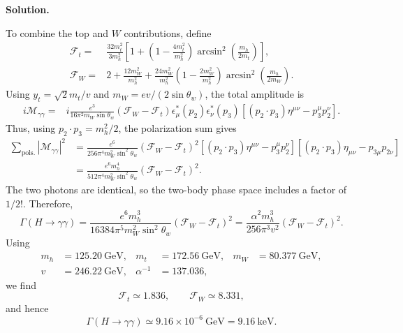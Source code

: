 \documentclass[a4paper,11pt]{article}
\newenvironment{solution}{\par\medskip\noindent\textbf{Solution.}\par\smallskip}{\par\medskip}
\begin{document}
\begin{solution}
To combine the top and $W$ contributions, define
\begin{equation}
\begin{aligned}
\mathcal F_t
={}&
\frac{32m_t^2}{3m_h^2}
\left[
1+\left(1-\frac{4m_t^2}{m_h^2}\right)
\arcsin^2\left(\frac{m_h}{2m_t}\right)
\right],
\\
\mathcal F_W
={}&
2+\frac{12m_W^2}{m_h^2}
+\frac{24m_W^2}{m_h^2}
\left(1-\frac{2m_W^2}{m_h^2}\right)
\arcsin^2\left(\frac{m_h}{2m_W}\right).
\end{aligned}
\end{equation}
Using $y_t=\sqrt{2}m_t/v$ and
$m_W=e v/(2\sin\theta_w)$, the total amplitude is
\begin{equation}
\begin{aligned}
i\mathcal M_{\gamma\gamma}
={}&
i\frac{e^3}{16\pi^2m_W\sin\theta_w}
(\mathcal F_W-\mathcal F_t)
\epsilon_\mu^*(p_2)\epsilon_\nu^*(p_3)
\left[
(p_2\cdot p_3)\eta^{\mu\nu}
-p_3^\mu p_2^\nu
\right].
\end{aligned}
\end{equation}
Thus, using $p_2\cdot p_3=m_h^2/2$, the polarization sum gives
\begin{equation}
\begin{aligned}
\sum_{\mathrm{pols.}}|\mathcal M_{\gamma\gamma}|^2
&=
\frac{e^6}{256\pi^4m_W^2\sin^2\theta_w}
(\mathcal F_W-\mathcal F_t)^2
\left[
(p_2\cdot p_3)\eta^{\mu\nu}-p_3^\mu p_2^\nu
\right]
\left[
(p_2\cdot p_3)\eta_{\mu\nu}-p_{3\mu}p_{2\nu}
\right]
\\
&=
\frac{e^6m_h^4}{512\pi^4m_W^2\sin^2\theta_w}
(\mathcal F_W-\mathcal F_t)^2.
\end{aligned}
\end{equation}
The two photons are identical, so the two-body phase space includes a factor
of $1/2!$. Therefore,
\begin{equation}
\boxed{
\Gamma(H\to\gamma\gamma)
=
\frac{e^6m_h^3}{16384\pi^5m_W^2\sin^2\theta_w}
(\mathcal F_W-\mathcal F_t)^2
=
\frac{\alpha^2m_h^3}{256\pi^3v^2}
(\mathcal F_W-\mathcal F_t)^2.
}
\end{equation}
Using
\begin{equation}
\begin{aligned}
m_h&=125.20~\mathrm{GeV},
&m_t&=172.56~\mathrm{GeV},
&m_W&=80.377~\mathrm{GeV},
\\
v&=246.22~\mathrm{GeV},
&\alpha^{-1}&=137.036,
\end{aligned}
\end{equation}
we find
\begin{equation}
\mathcal F_t\simeq1.836,
\qquad
\mathcal F_W\simeq8.331,
\end{equation}
and hence
\begin{equation}
\boxed{
\Gamma(H\to\gamma\gamma)
\simeq9.16\times10^{-6}~\mathrm{GeV}
=9.16~\mathrm{keV}.
}
\end{equation}


\end{solution}
\end{document}
